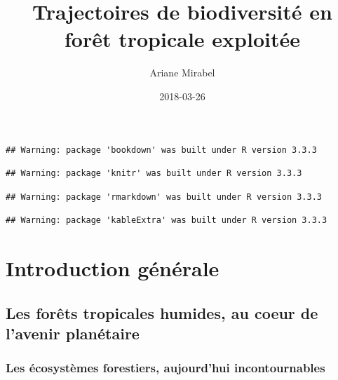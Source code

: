 \documentclass[
  11pt,
  french,
  A4paper,
  extrafontsizes,onecolumn,openright
  ]{memoir}
\title{Trajectoires de biodiversité en forêt tropicale exploitée}
\author{Ariane Mirabel}
\date{2018-03-26}
\begin{document}
\frontmatter



\makeflyleaf









\LargeMargins
{
\hypersetup{linkcolor=}
\setcounter{tocdepth}{3}
\tableofcontents
}



\LargeMargins
\begin{verbatim}
## Warning: package 'bookdown' was built under R version 3.3.3
\end{verbatim}

\begin{verbatim}
## Warning: package 'knitr' was built under R version 3.3.3
\end{verbatim}

\begin{verbatim}
## Warning: package 'rmarkdown' was built under R version 3.3.3
\end{verbatim}

\begin{verbatim}
## Warning: package 'kableExtra' was built under R version 3.3.3
\end{verbatim}

\mainmatter

\chapter{Introduction générale}\label{introduction-generale}

\section{Les forêts tropicales humides, au coeur de l'avenir
planétaire}\label{les-forets-tropicales-humides-au-coeur-de-lavenir-planetaire}

\subsection{Les écosystèmes forestiers, aujourd'hui
incontournables}\label{les-ecosystemes-forestiers-aujourdhui-incontournables}
\end{document}
